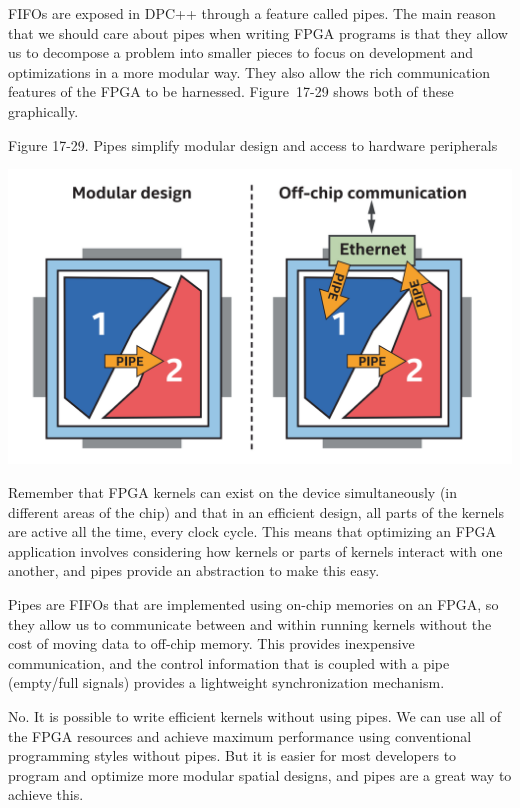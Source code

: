 FIFOs are exposed in DPC++ through a feature called pipes. The main reason that we should care about pipes when writing FPGA programs is that they allow us to decompose a problem into smaller pieces to focus on development and optimizations in a more modular way. They also allow the rich communication features of the FPGA to be harnessed. Figure 17-29 shows both of these graphically.\par

\hspace*{\fill} \par %
Figure 17-29. Pipes simplify modular design and access to hardware peripherals
\begin{center}
	\includegraphics[width=1.0\textwidth]{content/chapter-17/images/24}
\end{center}

Remember that FPGA kernels can exist on the device simultaneously (in different areas of the chip) and that in an efficient design, all parts of the kernels are active all the time, every clock cycle. This means that optimizing an FPGA application involves considering how kernels or parts of kernels interact with one another, and pipes provide an abstraction to make this easy.\par

Pipes are FIFOs that are implemented using on-chip memories on an FPGA, so they allow us to communicate between and within running kernels without the cost of moving data to off-chip memory. This provides inexpensive communication, and the control information that is coupled with a pipe (empty/full signals) provides a lightweight synchronization mechanism.\par

\begin{tcolorbox}[colback=blue!5!white,colframe=blue!75!black, title=DO WE NEED PIPES?]
No. It is possible to write efficient kernels without using pipes. We can use all of the FPGA resources and achieve maximum performance using conventional programming styles without pipes. But it is easier for most developers to program and optimize more modular spatial designs, and pipes are a great way to achieve this.
\end{tcolorbox}

